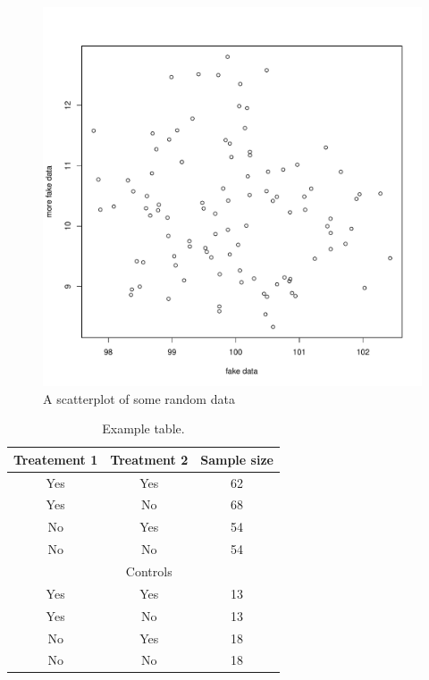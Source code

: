 \documentclass[letterpaper, 12pt]{article}
\begin{document}




\pagebreak
\begin{figure}[H]
    \centering
    \includegraphics[width=0.9\linewidth]{./results/scatterplot.pdf}
  \captionsetup{width=0.75\textwidth}
  \caption{A scatterplot of some random data}
    	\label{fig:scatterplot} %
\end{figure}

\pagebreak
\begin{table}[H]
    \centering
	\caption{Example table.}
	\label{table:simpleExample}
	\begin{tabular}{ccc} %
    \hline
	Treatement 1 & Treatment 2 & Sample size \\
    \hline
	 Yes & Yes & 62\\
	 Yes & No & 68\\
	 No & Yes & 54\\
	 No & No & 54\\
	 \hline
    & Controls & \\
    \hline
     Yes & Yes & 13\\
	 Yes & No & 13\\
	 No & Yes & 18\\
	 No & No & 18\\
	\hline
	\end{tabular}
\end{table}
\end{document}
